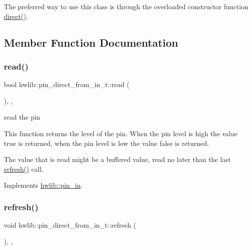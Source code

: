 The preferred way to use this class is through the overloaded constructor function \hyperlink{namespacehwlib_a43941b7f246ad934ee43dbfa0f5c8b5a}{direct()}. 

\subsection{Member Function Documentation}
\mbox{\label{classhwlib_1_1pin__direct__from__in__t_aa0f886a0c110b2bd259c6d3d25e50ee3}} 
\subsubsection{\texorpdfstring{read()}{read()}}
{\footnotesize\ttfamily bool hwlib\+::pin\+\_\+direct\+\_\+from\+\_\+in\+\_\+t\+::read (\begin{DoxyParamCaption}{ }\end{DoxyParamCaption})\hspace{0.3cm}{\ttfamily [inline]}, {\ttfamily [override]}, {\ttfamily [virtual]}}





read the pin

This function returns the level of the pin. When the pin level is high the value true is returned, when the pin level is low the value false is returned.

The value that is read might be a buffered value, read no later than the last \hyperlink{classhwlib_1_1pin__direct__from__in__t_a20c81ad1110ed11c39c4f555c74e7e3a}{refresh()} call. 

Implements \hyperlink{classhwlib_1_1pin__in_ad071bd2e17bb4af51390f6cbb728a194}{hwlib\+::pin\+\_\+in}.

\mbox{\label{classhwlib_1_1pin__direct__from__in__t_a20c81ad1110ed11c39c4f555c74e7e3a}} 
\subsubsection{\texorpdfstring{refresh()}{refresh()}}
{\footnotesize\ttfamily void hwlib\+::pin\+\_\+direct\+\_\+from\+\_\+in\+\_\+t\+::refresh (\begin{DoxyParamCaption}{ }\end{DoxyParamCaption})\hspace{0.3cm}{\ttfamily [inline]}, {\ttfamily [override]}, {\ttfamily [virtual]}}





